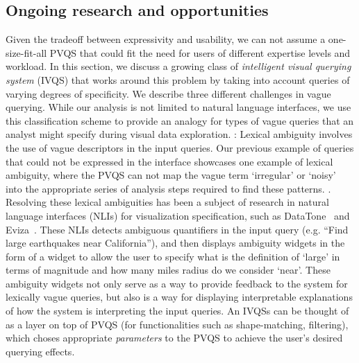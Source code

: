 \subsection{Ongoing research and opportunities}
\par Given the tradeoff between expressivity and usability, we can not assume a one-size-fit-all PVQS that could fit the need for users of different expertise levels and workload. In this section, we discuss a growing class of \textit{intelligent visual querying system} (IVQS) that works around this problem by taking into account  queries of varying degrees of specificity. We describe three different challenges in vague querying. While our analysis is not limited to natural language interfaces, we use this classification scheme to provide an analogy for types of vague queries that an analyst might specify during visual data exploration.
: Lexical ambiguity involves the use of vague descriptors in the input queries. Our previous example of queries that could not be expressed in the \zv interface showcases one example of lexical ambiguity, where the PVQS can not map the vague term `irregular' or `noisy' into the appropriate series of analysis steps required to find these patterns. . Resolving these lexical ambiguities has been a subject of research in natural language interfaces (NLIs) for visualization specification, such as DataTone~\cite{Gao2015} and Eviza~\cite{Setlur2016}. These NLIs detects ambiguous quantifiers in the input query (e.g. ``Find large earthquakes near California''), and then displays ambiguity widgets in the form of a widget to allow the user to specify what is the definition of `large' in terms of magnitude and how many miles radius do we consider `near'. These ambiguity widgets not only serve as a way to provide feedback to the system for lexically vague queries, but also is a way for displaying interpretable explanations of how the system is interpreting the input queries. An IVQSs can be thought of as a layer on top of PVQS (for functionalities such as shape-matching, filtering), which choses appropriate \textit{parameters} to the PVQS to achieve the user's desired querying effects.
